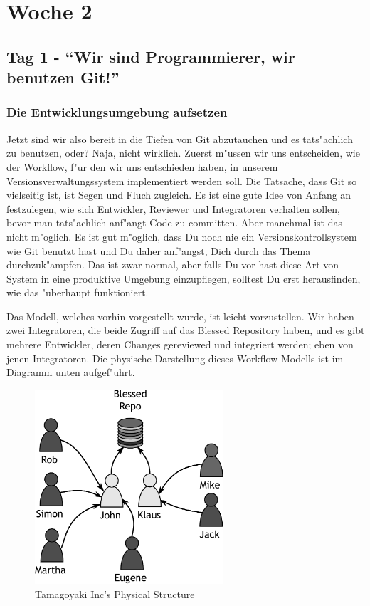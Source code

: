 \chapter{Woche 2}
\section{Tag 1 - ``Wir sind Programmierer, wir benutzen Git!''}
\subsection{Die Entwicklungsumgebung aufsetzen}


Jetzt sind wir also bereit in die Tiefen von Git abzutauchen und es tats"achlich zu benutzen, oder? Naja, nicht wirklich. Zuerst m"ussen wir uns entscheiden, wie der Workflow, f"ur den wir uns entschieden haben, in unserem Versionsverwaltungssystem implementiert werden soll. Die Tatsache, dass Git so vielseitig ist, ist Segen und Fluch zugleich. Es ist eine gute Idee von Anfang an festzulegen, wie sich Entwickler, Reviewer und Integratoren verhalten sollen, bevor man tats"achlich anf"angt Code zu committen. Aber manchmal ist das nicht m"oglich. Es ist gut m"oglich, dass Du noch nie ein Versionskontrollsystem wie Git benutzt hast und Du daher anf"angst, Dich durch das Thema durchzuk"ampfen.  Das ist zwar normal, aber falls Du vor hast diese Art von System in eine produktive Umgebung einzupflegen, solltest Du erst herausfinden, wie das "uberhaupt funktioniert. 

Das Modell, welches vorhin vorgestellt wurde, ist leicht vorzustellen. Wir haben zwei Integratoren, die beide Zugriff auf das Blessed Repository haben, und es gibt mehrere Entwickler, deren Changes gereviewed und integriert werden; eben von jenen Integratoren. Die physische Darstellung dieses Workflow-Modells ist im Diagramm unten aufgef"uhrt.

\begin{figure}[bt]
\centering
\includegraphics[width=7cm]{images/f-w2-d1.pdf}
\caption{Tamagoyaki Inc's Physical Structure}
\end{figure}

